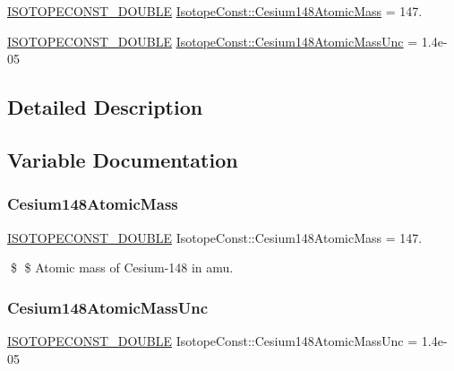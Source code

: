 \begin{DoxyCompactItemize}
\item 
\mbox{\hyperlink{group___isotope_const-_macros_ga8f45a7272ce02c0b4c65c44636ed719a}{I\+S\+O\+T\+O\+P\+E\+C\+O\+N\+S\+T\+\_\+\+D\+O\+U\+B\+LE}} \mbox{\hyperlink{group___isotope_const-_cesium-_cs148_gaca38dbf3f6e7c204591817d7823250bf}{Isotope\+Const\+::\+Cesium148\+Atomic\+Mass}} = 147.
\item 
\mbox{\hyperlink{group___isotope_const-_macros_ga8f45a7272ce02c0b4c65c44636ed719a}{I\+S\+O\+T\+O\+P\+E\+C\+O\+N\+S\+T\+\_\+\+D\+O\+U\+B\+LE}} \mbox{\hyperlink{group___isotope_const-_cesium-_cs148_ga6f8561f6d58aa0509a9d797573884cad}{Isotope\+Const\+::\+Cesium148\+Atomic\+Mass\+Unc}} = 1.\+4e-\/05
\end{DoxyCompactItemize}


\subsection{Detailed Description}


\subsection{Variable Documentation}
\mbox{\label{group___isotope_const-_cesium-_cs148_gaca38dbf3f6e7c204591817d7823250bf}} 
\subsubsection{\texorpdfstring{Cesium148\+Atomic\+Mass}{Cesium148AtomicMass}}
{\footnotesize\ttfamily \mbox{\hyperlink{group___isotope_const-_macros_ga8f45a7272ce02c0b4c65c44636ed719a}{I\+S\+O\+T\+O\+P\+E\+C\+O\+N\+S\+T\+\_\+\+D\+O\+U\+B\+LE}} Isotope\+Const\+::\+Cesium148\+Atomic\+Mass = 147.}

\$ \$ Atomic mass of Cesium-\/148 in amu. \mbox{\label{group___isotope_const-_cesium-_cs148_ga6f8561f6d58aa0509a9d797573884cad}} 
\subsubsection{\texorpdfstring{Cesium148\+Atomic\+Mass\+Unc}{Cesium148AtomicMassUnc}}
{\footnotesize\ttfamily \mbox{\hyperlink{group___isotope_const-_macros_ga8f45a7272ce02c0b4c65c44636ed719a}{I\+S\+O\+T\+O\+P\+E\+C\+O\+N\+S\+T\+\_\+\+D\+O\+U\+B\+LE}} Isotope\+Const\+::\+Cesium148\+Atomic\+Mass\+Unc = 1.\+4e-\/05}

